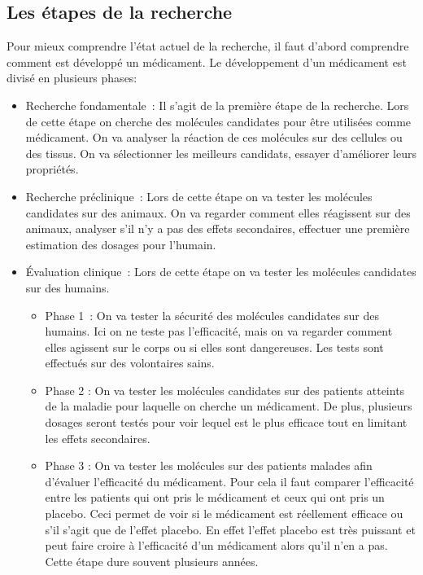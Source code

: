 \documentclass[12pt,a4paper]{report}
\begin{document}
\begin{appendix}

    \chapter{Les étapes de la recherche} \label{annexe:etapes_recherche}

    Pour mieux comprendre l'état actuel de la recherche, il faut d'abord comprendre comment est développé un médicament.
Le développement d'un médicament est divisé en plusieurs phases: \cite{DeveloppementMedicamentInserm}

\begin{itemize}
    \item Recherche fondamentale : Il s'agit de la première étape de la recherche.
    Lors de cette étape on cherche des molécules candidates pour être utilisées comme médicament.
    On va analyser la réaction de ces molécules sur des cellules ou des tissus.
    On va sélectionner les meilleurs candidats, essayer d'améliorer leurs propriétés.

    \item Recherche préclinique : Lors de cette étape on va tester les molécules candidates sur des animaux.
    On va regarder comment elles réagissent sur des animaux, analyser s'il n'y a pas des effets secondaires, effectuer une première estimation des dosages pour l'humain.

    \item Évaluation clinique : Lors de cette étape on va tester les molécules candidates sur des humains.

    \begin{itemize}
        \item Phase 1 : On va tester la sécurité des molécules candidates sur des humains. Ici on ne teste pas l'efficacité, mais on va regarder comment elles agissent sur le corps ou si elles sont dangereuses. Les tests sont effectués sur des volontaires sains.
        \item Phase 2 : On va tester les molécules candidates sur des patients atteints de la maladie pour laquelle on cherche un médicament. De plus, plusieurs dosages seront testés pour voir lequel est le plus efficace tout en limitant les effets secondaires.
        \item Phase 3 : On va tester les molécules sur des patients malades afin d'évaluer l'efficacité du médicament. Pour cela il faut comparer l'efficacité entre les patients qui ont pris le médicament et ceux qui ont pris un placebo. Ceci permet de voir si le médicament est réellement efficace ou s'il s'agit que de l'effet placebo. En effet l'effet placebo est très puissant et peut faire croire à l'efficacité d'un médicament alors qu'il n'en a pas. \cite{decraenPlacebosPlaceboEffects1999} Cette étape dure souvent plusieurs années.
    \end{itemize}


\end{itemize}
\end{appendix}
\end{document}
